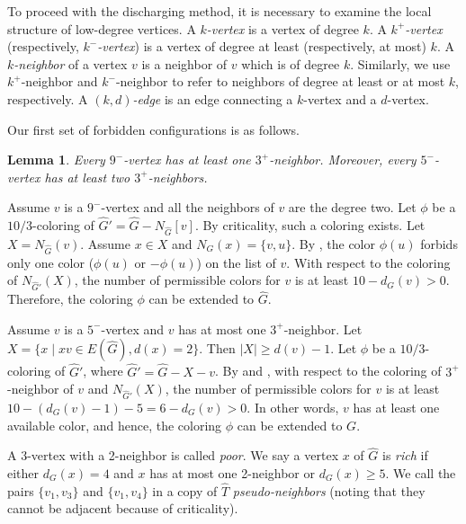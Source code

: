 \documentclass[11pt,a4paper]{article}
\makeatletter
\renewenvironment{proof}[1][\proofname]{\par
	\pushQED{\qed}%
	\normalfont \topsep6\p@\@plus6\p@\relax
	\trivlist
	\item[\hskip\labelsep
	\bfseries
	#1\@addpunct{.}]\ignorespaces
}{%
	\popQED\endtrivlist\@endpefalse
}
\newtheorem{lemma}[theorem]{Lemma}
\theoremstyle{definition}
\makeatother
\begin{document}
To proceed with the discharging method, it is necessary to examine the local structure of low-degree vertices. A \emph{$k$-vertex} is a vertex of degree $k$. A \emph{$k^+$-vertex} (respectively, \emph{$k^-$-vertex}) is a vertex of degree at least (respectively, at most) $k$. A \emph{$k$-neighbor} of a vertex $v$ is a neighbor of $v$ which is of degree $k$. Similarly, we use $k^+$-neighbor and $k^-$-neighbor to refer to neighbors of degree at least or at most $k$, respectively. A \emph{$(k,d)$-edge} is an edge connecting a $k$-vertex and a $d$-vertex.

Our first set of forbidden configurations is as follows.

\begin{lemma}\label{lem:TwoNeighborCount}
	Every $9^-$-vertex has at least one $3^+$-neighbor. Moreover, every $5^-$-vertex has at least two $3^+$-neighbors. 
\end{lemma} 
\begin{proof}
	
	Assume $v$ is a $9^-$-vertex and all the neighbors of $v$ are the degree two. Let $\phi$ be a $10/3$-coloring of  $\widehat{G}'=\widehat{G}-N_{\widehat{G}}[v]$. By criticality, such a coloring exists. Let $X=N_{\widehat{G}}(v)$. Assume $x\in X$ and $N_{G}(x)=\{v,u\}$. By , the color $\phi(u)$  forbids only one color ($\phi(u)$ or $-\phi(u)$) on the list of $v$. With respect to the coloring of $N_{\widehat{G}'}(X)$, the number of permissible colors for $v$ is at least $10-d_{G}(v)>0$. Therefore, the coloring $\phi$ can be extended to $\widehat{G}$.
	
	Assume $v$ is a $5^-$-vertex and $v$ has at most one $3^+$-neighbor. Let $X=\{x\mid xv\in E(\widehat{G}), d(x)=2\}$. Then $|X|\geq d(v)-1$. Let $\phi$ be a $10/3$-coloring of  $\widehat{G}'$, where $\widehat{G}'=\widehat{G}-X-v$. 
	By  and , with respect to the coloring of $3^+$-neighbor of $v$ and $N_{\widehat{G}'}(X)$, the number of permissible colors for $v$ is at least $10-(d_{G}(v)-1)-5=6-d_G(v)>0$. In other words, $v$ has at least one available color, and hence, the coloring $\phi$ can be extended to $G$.
\end{proof}

A $3$-vertex with a 2-neighbor is called  \emph{poor}. We say a vertex $x$ of $\widehat{G}$ is \emph{rich} if either $d_{G}(x)=4$ and $x$ has at most one 2-neighbor or $d_{G}(x)\geq 5$. We call the pairs $\{v_{1}, v_{3}\}$ and $\{v_{1}, v_{4}\}$ in a copy of $\widehat{T}$ \emph{pseudo-neighbors} (noting that they cannot be adjacent because of criticality).
\end{document}
